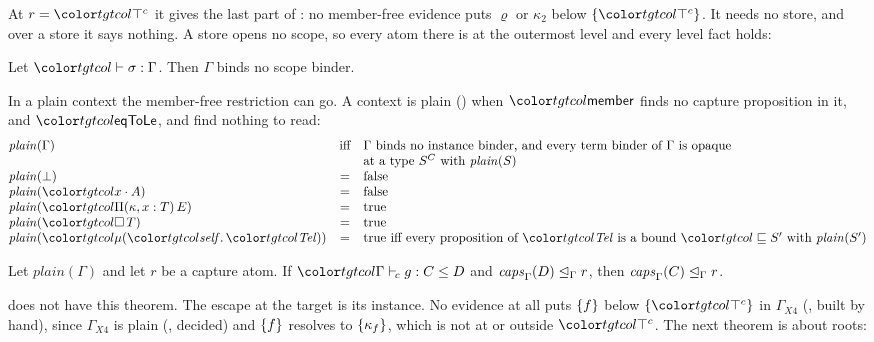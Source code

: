 At $r = \topc$ it gives the last part of : no member-free evidence puts $\varrho$ or $\kappa_2$ below $\cset{\topc}$. It needs no store, and over a store it says nothing. A store opens no scope, so every atom there is at the outermost level and every level fact holds:

\begin{lemma}\label{lem:lvl-rootfree}
Let $\storej{\sigma}{\Gamma}$. Then $\Gamma$ binds no scope binder.
\end{lemma}

In a plain context the member-free restriction can go. A context is plain () when $\ev{member}$ finds no capture proposition in it, and $\ev{eqToLe}$,  and  find nothing to read:
\[
\begin{array}{@{}lcl@{}}
\mathit{plain}(\Gamma) & \text{iff} & \Gamma \text{ binds no instance binder, and every term binder of } \Gamma \text{ is opaque} \\
 & & \text{at a type } \capt{S}{C} \text{ with } \mathit{plain}(S) \\
\mathit{plain}(\bot) & = & \text{false} \\
\mathit{plain}(\sel{x}{A}) & = & \text{false} \\
\mathit{plain}(\pit[\kappa, x]{T}{E}) & = & \text{true} \\
\mathit{plain}(\boxt{T}) & = & \text{true} \\
\mathit{plain}(\obj{\tel}) & = & \text{true iff every proposition of } \tel \text{ is a bound } \pbnd{S'} \text{ with } \mathit{plain}(S')
\end{array}
\]

\begin{theorem}\label{thm:lvl-plain}
Let $\mathit{plain}(\Gamma)$ and let $r$ be a capture atom. If $\clej{\Gamma}{g}{C}{D}$ and $\mathit{caps}^{}_{\Gamma}(D) \trianglelefteq_{\Gamma} r$, then $\mathit{caps}^{}_{\Gamma}(C) \trianglelefteq_{\Gamma} r$.
\end{theorem}

\treeCL does not have this theorem. The escape at the target is its instance. No evidence at all puts $\{f\}$ below $\cset{\topc}$ in $\Gamma_{\!X4}$ (, built by hand), since $\Gamma_{\!X4}$ is plain (, decided) and $\{f\}$ resolves to $\{\kappa_f\}$, which is not at or outside $\topc$. The next theorem is about roots:

